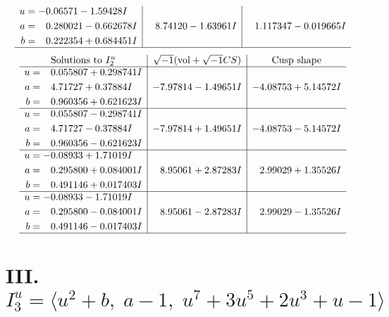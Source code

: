 \documentclass[1p]{elsarticle_modified}
\theoremstyle{definition}
\newcommand{\I}{\sqrt{-1}}
\begin{document}
$$\begin{array}{c|c|c}
\begin{aligned}
u &= -0.06571 - 1.59428 I \\
a &= \phantom{-}0.280021 - 0.662678 I \\
b &= \phantom{-}0.222354 + 0.684451 I\end{aligned}
 & \phantom{-}8.74120 - 1.63961 I & \phantom{-}1.117347 - 0.019665 I\\
 \hline 
 \end{array}$$\newpage$$\begin{array}{c|c|c}  
\text{Solutions to }I^u_{2}& \I (\text{vol} + \sqrt{-1}CS) & \text{Cusp shape}\\
 \hline 
\begin{aligned}
u &= \phantom{-}0.055807 + 0.298741 I \\
a &= \phantom{-}4.71727 + 0.37884 I \\
b &= \phantom{-}0.960356 + 0.621623 I\end{aligned}
 & -7.97814 - 1.49651 I & -4.08753 + 5.14572 I \\ \hline\begin{aligned}
u &= \phantom{-}0.055807 - 0.298741 I \\
a &= \phantom{-}4.71727 - 0.37884 I \\
b &= \phantom{-}0.960356 - 0.621623 I\end{aligned}
 & -7.97814 + 1.49651 I & -4.08753 - 5.14572 I \\ \hline\begin{aligned}
u &= -0.08933 + 1.71019 I \\
a &= \phantom{-}0.295800 + 0.084001 I \\
b &= \phantom{-}0.491146 + 0.017403 I\end{aligned}
 & \phantom{-}8.95061 + 2.87283 I & \phantom{-}2.99029 + 1.35526 I \\ \hline\begin{aligned}
u &= -0.08933 - 1.71019 I \\
a &= \phantom{-}0.295800 - 0.084001 I \\
b &= \phantom{-}0.491146 - 0.017403 I\end{aligned}
 & \phantom{-}8.95061 - 2.87283 I & \phantom{-}2.99029 - 1.35526 I\\
 \hline 
 \end{array}$$\newpage\newpage\renewcommand{\arraystretch}{1}
\centering \section*{III. $I^u_{3}= \langle u^2+b,\;a-1,\;u^7+3 u^5+2 u^3+u-1 \rangle$}
\end{document}

